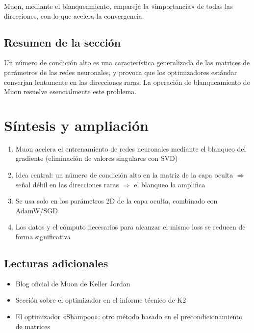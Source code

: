 \documentclass[a4paper]{article}
\begin{document}
Muon, mediante el blanqueamiento, empareja la «importancia» de todas las direcciones, con lo que acelera la convergencia.

\subsection{Resumen de la sección}

Un número de condición alto es una característica generalizada de las matrices de parámetros de las redes neuronales, y provoca que los optimizadores estándar converjan lentamente en las direcciones raras. La operación de blanqueamiento de Muon resuelve esencialmente este problema.

\section{Síntesis y ampliación}

\begin{enumerate}
  \item Muon acelera el entrenamiento de redes neuronales mediante el blanqueo del gradiente (eliminación de valores singulares con SVD)
  \item Idea central: un número de condición alto en la matriz de la capa oculta $\Rightarrow$ señal débil en las direcciones raras $\Rightarrow$ el blanqueo la amplifica
  \item Se usa solo en los parámetros 2D de la capa oculta, combinado con AdamW/SGD
  \item Los datos y el cómputo necesarios para alcanzar el mismo loss se reducen de forma significativa
\end{enumerate}

\subsection{Lecturas adicionales}
\begin{itemize}
  \item Blog oficial de Muon de Keller Jordan
  \item Sección sobre el optimizador en el informe técnico de K2
  \item El optimizador «Shampoo»: otro método basado en el precondicionamiento de matrices
\end{itemize}
\end{document}
